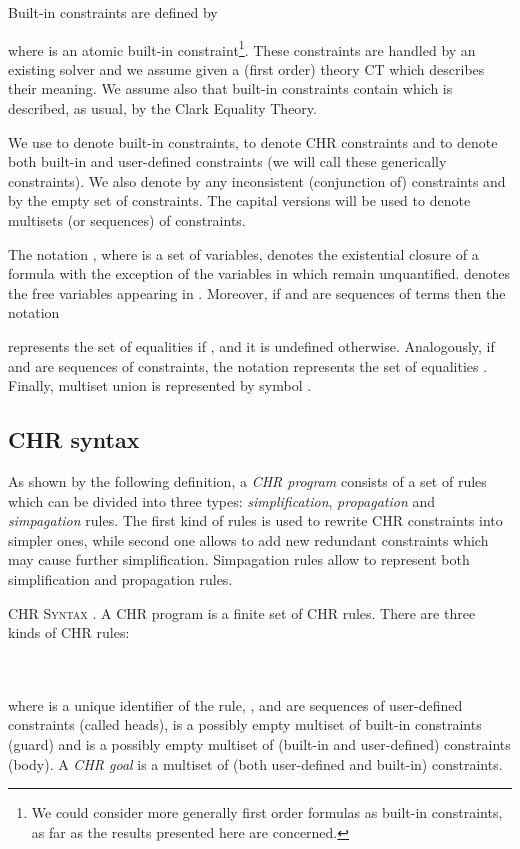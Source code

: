 \documentclass[final]{acmtrans2e}
\begin{document}
Built-in constraints are defined by

where  is an atomic built-in constraint\footnote{We could
consider more generally first order formulas as built-in
constraints, as far as the results presented here are concerned.}.
These constraints are handled by an existing solver and we assume
given a (first order) theory CT which describes their meaning.
We assume also that built-in constraints contain  which is described, as usual, by the Clark Equality Theory.

We use  to denote built-in constraints,  to denote CHR
constraints and  to denote both built-in and user-defined
constraints (we will call these generically constraints).  We also
denote by  any inconsistent (conjunction of)
constraints and by  the empty set of
constraints. The capital versions will be used to denote multisets
(or sequences) of constraints.


The notation , where  is a set of variables,
denotes the existential closure of a formula  with the
exception of the variables in  which remain unquantified.
 denotes the free variables appearing in .
Moreover, if  and  are sequences of terms then the notation

represents the set of equalities  if , and it is undefined otherwise.
Analogously, if  and  are sequences of constraints, the notation
 represents the set of equalities .
Finally, multiset union is represented by symbol .

\subsection{CHR syntax}\label{sec:syntax}
As shown by the following definition, a  \emph{CHR program}
consists of a set of rules which can be divided into three types:
\emph{simplification}, \emph{propagation} and \emph{simpagation}
rules. The first kind of rules is used to rewrite
CHR constraints into simpler ones, while second one allows to add new redundant
constraints which may cause further simplification. Simpagation rules allow to represent both simplification and propagation rules.

\begin{definition}\textsc{CHR Syntax} \cite{Fru98}.
A CHR program is a finite set of CHR rules.
There are three kinds of CHR rules:

\\
\\
\noindent where  is a unique identifier of the rule, ,  and  are
sequences of user-defined constraints (called heads),  is a
possibly empty multiset of built-in constraints (guard) and  is
a possibly empty multiset of (built-in and user-defined)
constraints (body). A \emph{CHR goal} is a multiset of (both
user-defined and built-in) constraints.
\end{definition}
\end{document}
